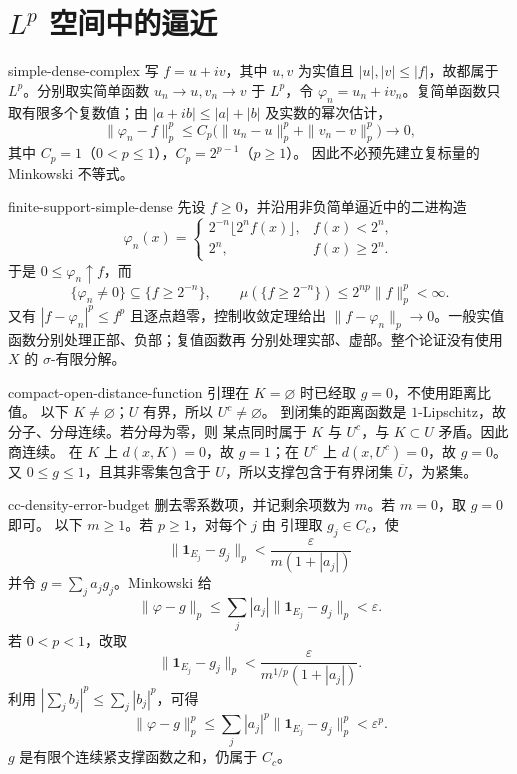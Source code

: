 \chapter{\texorpdfstring{\(L^p\)}{Lp} 空间中的逼近}

\begin{solution}{simple-dense-complex}
写 \(f=u+iv\)，其中 \(u,v\) 为实值且
\(|u|,|v|\le|f|\)，故都属于 \(L^p\)。分别取实简单函数
\(u_n\to u,v_n\to v\) 于 \(L^p\)，令
\(\varphi_n=u_n+iv_n\)。复简单函数只取有限多个复数值；由
\(|a+ib|\le|a|+|b|\) 及实数的幂次估计，
\[
 \|\varphi_n-f\|_p^p
 \le C_p\bigl(\|u_n-u\|_p^p+\|v_n-v\|_p^p\bigr)\to0,
\]
其中 \(C_p=1\)（\(0<p\le1\)），\(C_p=2^{p-1}\)（\(p\ge1\)）。
因此不必预先建立复标量的 Minkowski 不等式。
\end{solution}

\begin{solution}{finite-support-simple-dense}
先设 \(f\ge0\)，并沿用非负简单逼近中的二进构造
\[
 \varphi_n(x)=
 \begin{cases}
  2^{-n}\lfloor2^nf(x)\rfloor,&f(x)<2^n,\\
  2^n,&f(x)\ge2^n.
 \end{cases}
\]
于是 \(0\le\varphi_n\uparrow f\)，而
\[
 \{\varphi_n\ne0\}\subseteq\{f\ge2^{-n}\},
 \qquad
 \mu(\{f\ge2^{-n}\})
 \le2^{np}\|f\|_p^p<\infty.
\]
又有 \(|f-\varphi_n|^p\le f^p\) 且逐点趋零，控制收敛定理给出
\(\|f-\varphi_n\|_p\to0\)。一般实值函数分别处理正部、负部；复值函数再
分别处理实部、虚部。整个论证没有使用 \(X\) 的 \(\sigma\)-有限分解。
\end{solution}

\begin{solution}{compact-open-distance-function}
引理在 \(K=\varnothing\) 时已经取 \(g=0\)，不使用距离比值。
以下 \(K\ne\varnothing\)；\(U\) 有界，所以 \(U^c\ne\varnothing\)。
到闭集的距离函数是 \(1\)-Lipschitz，故分子、分母连续。若分母为零，则
某点同时属于 \(K\) 与 \(U^c\)，与 \(K\subset U\) 矛盾。因此商连续。
在 \(K\) 上 \(d(x,K)=0\)，故 \(g=1\)；在 \(U^c\) 上
\(d(x,U^c)=0\)，故 \(g=0\)。又 \(0\le g\le1\)，且其非零集包含于
\(U\)，所以支撑包含于有界闭集 \(\overline U\)，为紧集。
\end{solution}

\begin{solution}{cc-density-error-budget}
删去零系数项，并记剩余项数为 \(m\)。若 \(m=0\)，取 \(g=0\) 即可。
以下 \(m\ge1\)。若 \(p\ge1\)，对每个 \(j\) 由
引理取 \(g_j\in C_c\)，使
\[
 \|\mathbf1_{E_j}-g_j\|_p
 <\frac{\varepsilon}{m(1+|a_j|)}
\]
并令 \(g=\sum_ja_jg_j\)。Minkowski 给
\[
 \|\varphi-g\|_p
 \le\sum_j|a_j|\|\mathbf1_{E_j}-g_j\|_p
 <\varepsilon.
\]
若 \(0<p<1\)，改取
\[
 \|\mathbf1_{E_j}-g_j\|_p
 <\frac{\varepsilon}{m^{1/p}(1+|a_j|)}.
\]
利用 \(|\sum_jb_j|^p\le\sum_j|b_j|^p\)，可得
\[
 \|\varphi-g\|_p^p
 \le\sum_j|a_j|^p\|\mathbf1_{E_j}-g_j\|_p^p
 <\varepsilon^p.
\]
\(g\) 是有限个连续紧支撑函数之和，仍属于 \(C_c\)。
\end{solution}

